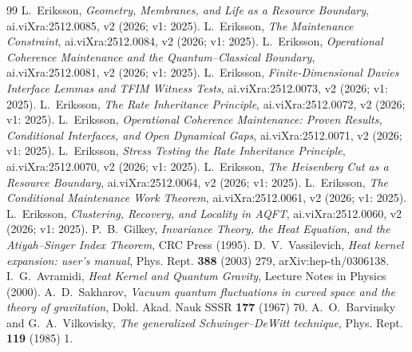\documentclass[11pt,a4paper]{article}
\begin{document}
\begin{thebibliography}{99}\small
{} L.~Eriksson, \emph{Geometry, Membranes, and Life as a Resource
Boundary}, ai.viXra:2512.0085, v2 (2026; v1: 2025).
 L.~Eriksson, \emph{The Maintenance Constraint}, ai.viXra:2512.0084,
v2 (2026; v1: 2025).
 L.~Eriksson, \emph{Operational Coherence Maintenance and the
Quantum--Classical Boundary}, ai.viXra:2512.0081, v2 (2026; v1: 2025).
 L.~Eriksson, \emph{Finite-Dimensional Davies Interface Lemmas
and TFIM Witness Tests}, ai.viXra:2512.0073, v2 (2026; v1: 2025).
 L.~Eriksson, \emph{The Rate Inheritance Principle},
ai.viXra:2512.0072, v2 (2026; v1: 2025).
 L.~Eriksson, \emph{Operational Coherence Maintenance: Proven
Results, Conditional Interfaces, and Open Dynamical Gaps}, ai.viXra:2512.0071,
v2 (2026; v1: 2025).
 L.~Eriksson, \emph{Stress Testing the Rate Inheritance
Principle}, ai.viXra:2512.0070, v2 (2026; v1: 2025).
 L.~Eriksson, \emph{The Heisenberg Cut as a Resource Boundary},
ai.viXra:2512.0064, v2 (2026; v1: 2025).
 L.~Eriksson, \emph{The Conditional Maintenance Work Theorem},
ai.viXra:2512.0061, v2 (2026; v1: 2025).
 L.~Eriksson, \emph{Clustering, Recovery, and Locality in
AQFT}, ai.viXra:2512.0060, v2 (2026; v1: 2025).
 P.~B.~Gilkey, \emph{Invariance Theory, the Heat Equation, and
the Atiyah--Singer Index Theorem}, CRC Press (1995).
 D.~V.~Vassilevich, \emph{Heat kernel expansion: user's
manual}, Phys. Rept. \textbf{388} (2003) 279, arXiv:hep-th/0306138.
 I.~G.~Avramidi, \emph{Heat Kernel and Quantum Gravity},
Lecture Notes in Physics (2000).
 A.~D.~Sakharov, \emph{Vacuum quantum fluctuations in curved
space and the theory of gravitation}, Dokl. Akad. Nauk SSSR \textbf{177}
(1967) 70.
 A.~O.~Barvinsky and G.~A.~Vilkovisky, \emph{The
generalized Schwinger--DeWitt technique}, Phys. Rept. \textbf{119} (1985) 1.
\end{thebibliography}
\end{document}
